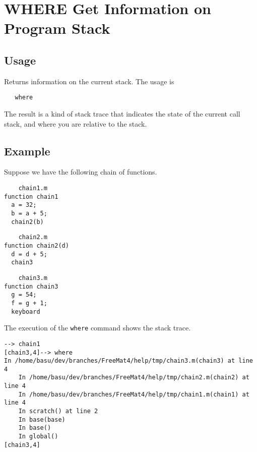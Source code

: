 \section{WHERE Get Information on Program Stack}

\subsection{Usage}

Returns information on the current stack.  The usage is
\begin{verbatim}
   where
\end{verbatim}
The result is a kind of stack trace that indicates the state
of the current call stack, and where you are relative to the
stack.
\subsection{Example}

Suppose we have the following chain of functions.
\begin{verbatim}
    chain1.m
function chain1
  a = 32;
  b = a + 5;
  chain2(b)
\end{verbatim}
\begin{verbatim}
    chain2.m
function chain2(d)
  d = d + 5;
  chain3
\end{verbatim}
\begin{verbatim}
    chain3.m
function chain3
  g = 54;
  f = g + 1;
  keyboard
\end{verbatim}
The execution of the \verb|where| command shows the stack trace.
\begin{verbatim}
--> chain1
[chain3,4]--> where
In /home/basu/dev/branches/FreeMat4/help/tmp/chain3.m(chain3) at line 4
    In /home/basu/dev/branches/FreeMat4/help/tmp/chain2.m(chain2) at line 4
    In /home/basu/dev/branches/FreeMat4/help/tmp/chain1.m(chain1) at line 4
    In scratch() at line 2
    In base(base)
    In base()
    In global()
[chain3,4]
\end{verbatim}
